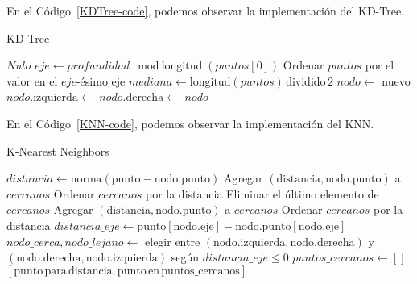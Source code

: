 \documentclass{article}
\begin{document}
\begin{sloppypar}
En el Código~\ref{KDTree-code}, podemos observar la implementación del KD-Tree.
\begin{algorithm}[H]
\caption{KD-Tree}
\label{KDTree-code}
\begin{algorithmic}
        \State \Return $Nulo$
    \EndIf
    \State $eje \gets profundidad \mod \text{longitud}(puntos[0])$
    \State Ordenar $puntos$ por el valor en el $eje$-ésimo eje
    \State $mediana \gets \text{longitud}(puntos) \, \text{dividido} \, 2$
    \State $nodo \gets$ nuevo 
    \State $nodo.\text{izquierda} \gets$ 
    \State $nodo.\text{derecha} \gets$ 
    \State \Return $nodo$
\EndFunction
\end{algorithmic}
\end{algorithm}

En el Código~\ref{KNN-code}, podemos observar la implementación del KNN.
\begin{algorithm}[H]
\caption{K-Nearest Neighbors}
\label{KNN-code}
\begin{algorithmic}
            \State \Return
        \EndIf
        \State $distancia \gets \text{norma}(\text{punto} - \text{nodo.punto})$
            \State Agregar $(\text{distancia}, \text{nodo.punto})$ a $cercanos$
            \State Ordenar $cercanos$ por la distancia
            \State Eliminar el último elemento de $cercanos$
            \State Agregar $(\text{distancia}, \text{nodo.punto})$ a $cercanos$
            \State Ordenar $cercanos$ por la distancia
        \EndIf
        \State $distancia\_eje \gets \text{punto}[\text{nodo.eje}] - \text{nodo.punto}[\text{nodo.eje}]$
        \State $nodo\_cerca, nodo\_lejano \gets$ elegir entre $(\text{nodo.izquierda}, \text{nodo.derecha})$ y $(\text{nodo.derecha}, \text{nodo.izquierda})$ según $distancia\_eje \leq 0$
        \State {}
            \State {}
        \EndIf
    \EndFunction    
    \State $puntos\_cercanos \gets []$
    \State {}
    \State \Return $[\text{punto} \, \text{para} \, \text{distancia}, \text{punto} \, \text{en} \, \text{puntos\_cercanos}]$
\EndFunction
\end{algorithmic}
\end{algorithm}



\end{sloppypar}
\end{document}

